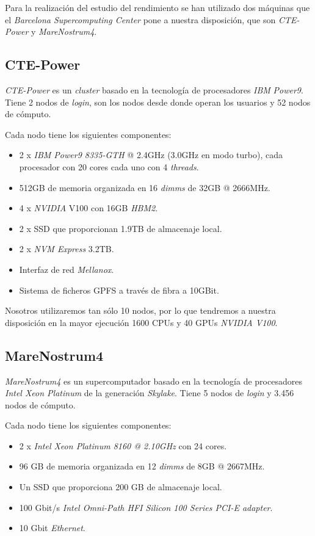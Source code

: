 Para la realización del estudio del rendimiento se han utilizado dos máquinas que el \textit{Barcelona Supercomputing Center} pone a nuestra disposición, que son \textit{CTE-Power} y \textit{MareNostrum4}.

\subsection{CTE-Power}
\label{sec:power}

\textit{CTE-Power} es un \textit{cluster} basado en la tecnología de procesadores \textit{IBM} \textit{Power9}. Tiene 2 nodos de \textit{login}, son los nodos desde donde operan los usuarios y 52 nodos de cómputo. 
\par\smallskip
Cada nodo tiene los siguientes componentes:
\par\smallskip
\begin{itemize}
	\item 2 x \textit{IBM Power9 8335-GTH} @ 2.4GHz (3.0GHz en modo turbo), cada procesador con 20 cores cada uno con 4 \textit{threads}.
	\item 512GB de memoria organizada en 16 \textit{dimms} de 32GB @ 2666MHz.
	\item 4 x \textit{NVIDIA} V100 con 16GB \textit{HBM2}.
	\item 2 x SSD que proporcionan 1.9TB de almacenaje local.
	\item 2 x \textit{NVM Express} 3.2TB.
	\item Interfaz de red \textit{Mellanox}.
	\item Sistema de ficheros GPFS a través de fibra a 10GBit.
\end{itemize}

Nosotros utilizaremos tan sólo 10 nodos, por lo que tendremos a nuestra disposición en la mayor ejecución 1600 CPUs y 40 GPUs \textit{NVIDIA V100}. 

\subsection{MareNostrum4}
\label{sec:mare}

\textit{MareNostrum4} es un supercomputador basado en la tecnología de procesadores \textit{Intel Xeon Platinum} de la generación \textit{Skylake}. Tiene 5 nodos de \textit{login} y 3.456 nodos de cómputo.
\par\smallskip
Cada nodo tiene los siguientes componentes:
\par\smallskip
\begin{itemize}
	\item 2 x \textit{Intel Xeon Platinum 8160 @ 2.10GHz} con 24 cores.
	\item 96 GB de memoria organizada en 12 \textit{dimms} de 8GB @ 2667MHz.
	\item Un SSD que proporciona 200 GB de almacenaje local.
	\item 100 Gbit/s \textit{Intel Omni-Path HFI Silicon 100 Series PCI-E adapter}.
	\item 10 Gbit \textit{Ethernet}.
\end{itemize}

